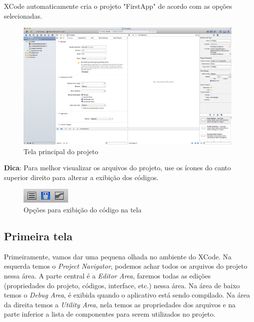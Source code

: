 \documentclass[a4paper,12pt,brazil,oneside]{book}
\begin{document}
XCode automaticamente cria o projeto "FirstApp" de acordo com as opções selecionadas.

\begin{figure}[H]
  \centering
  \includegraphics[width=.99\textwidth]{figuras/3/tela_novo_projeto_4.png}
  \caption{Tela principal do projeto}
  \label{fig:a}
\end{figure}

\begin{framed}

\textbf{Dica}: Para melhor visualizar os arquivos do projeto, use os ícones do canto superior direito para alterar a exibição dos códigos.
\end{framed}

\begin{figure}[H]
  \centering
  \includegraphics[scale=1]{figuras/3/tela_opcao_exibicao.png}
  \caption{Opções para exibição do código na tela}
  \label{fig:a}
\end{figure}

\subsection{Primeira tela}


Primeiramente, vamos dar uma pequena olhada no ambiente do XCode. Na esquerda temos o \emph{Project Navigator}, podemos achar todos os arquivos do projeto nessa área. A parte central é a \emph{Editor Area}, faremos todas as edições (propriedades do projeto, códigos, interface, etc.) nessa área. Na área de baixo temos o \emph{Debug Area}, é exibida quando o aplicativo está sendo compilado. Na área da direita temos a \emph{Utility Area}, nela temos as propriedades dos arquivos e na parte inferior a lista de componentes para serem utilizados no projeto.
\end{document}
